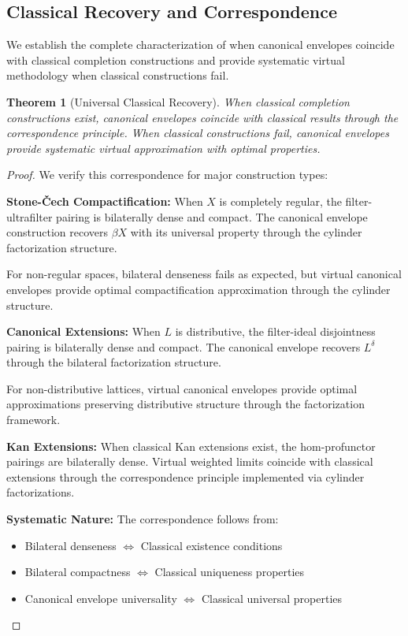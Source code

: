 \documentclass[11pt]{article}
\theoremstyle{plain}
\newtheorem{theorem}{Theorem}[section]
\theoremstyle{definition}
\theoremstyle{remark}
\begin{document}
\subsection{Classical Recovery and Correspondence}

We establish the complete characterization of when canonical envelopes coincide with classical completion constructions and provide systematic virtual methodology when classical constructions fail.

\begin{theorem}[Universal Classical Recovery]
When classical completion constructions exist, canonical envelopes coincide with classical results through the correspondence principle. When classical constructions fail, canonical envelopes provide systematic virtual approximation with optimal properties.
\end{theorem}

\begin{proof}
We verify this correspondence for major construction types:

\textbf{Stone-\v{C}ech Compactification:} When $X$ is completely regular, the filter-ultrafilter pairing is bilaterally dense and compact. The canonical envelope construction recovers $\beta X$ with its universal property through the cylinder factorization structure.

For non-regular spaces, bilateral denseness fails as expected, but virtual canonical envelopes provide optimal compactification approximation through the cylinder structure.

\textbf{Canonical Extensions:} When $L$ is distributive, the filter-ideal disjointness pairing is bilaterally dense and compact. The canonical envelope recovers $L^{\delta}$ through the bilateral factorization structure.

For non-distributive lattices, virtual canonical envelopes provide optimal approximations preserving distributive structure through the factorization framework.

\textbf{Kan Extensions:} When classical Kan extensions exist, the hom-profunctor pairings are bilaterally dense. Virtual weighted limits coincide with classical extensions through the correspondence principle implemented via cylinder factorizations.

\textbf{Systematic Nature:} The correspondence follows from:
\begin{itemize}
\item Bilateral denseness $\Leftrightarrow$ Classical existence conditions
\item Bilateral compactness $\Leftrightarrow$ Classical uniqueness properties  
\item Canonical envelope universality $\Leftrightarrow$ Classical universal properties
\end{itemize}
\end{proof}
\end{document}
